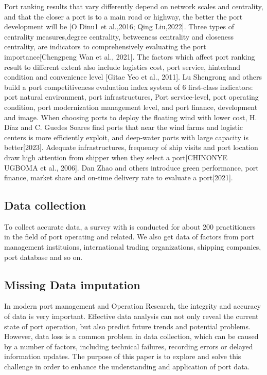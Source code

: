 \documentclass[preprint]{elsarticle}
\begin{document}
Port ranking results that vary differently depend on network scales and centrality, and that the closer a port is to a main road or highway, the better the port development will be [O Dinu1 et al.,2016; Qing Liu,2022]. Three types of centrality measures,degree centrality, betweeness centrality and closeness centrality, are indicators to comprehensively evaluating the port importance[Chengpeng Wan et al., 2021]. The factors which affect port ranking result to different extent also include logistics cost, port service, hinterland condition and convenience level [Gitae Yeo et al., 2011]. Lu Shengrong and others build a port competitiveness evaluation index system of 6 first-class indicators: port natural environment, port infrastructures, Port service-level, port operating condition, port modernization management level, and port finance, development and image. When choosing ports to deploy the floating wind with lower cost, H. Díaz  and C. Guedes Soares find ports that near the wind farms and logistic centers is more efficiently exploit, and deep-water ports with large capacity is better[2023]. Adequate infrastructures,  frequency of ship visits and port location draw high attention from shipper when they select a port[CHINONYE UGBOMA et al., 2006]. Dan Zhao and others introduce green performance, port finance, market share and on-time delivery rate to evaluate a port[2021].

\subsection{Data collection}

To collect accurate data, a survey with is conducted for about 200 practitioners in the field of port operating and related. We also get data of factors from port management instituions, international trading organizations, shipping companies, port database and so on.



\subsection{Missing Data imputation}

In modern port management and Operation Research, the integrity and accuracy of data is very important. Effective data analysis can not only reveal the current state of port operation, but also predict future trends and potential problems. However, data loss is a common problem in data collection, which can be caused by a number of factors, including technical failures, recording errors or delayed information updates. The purpose of this paper is to explore and solve this challenge in order to enhance the understanding and application of port data.
\end{document}

